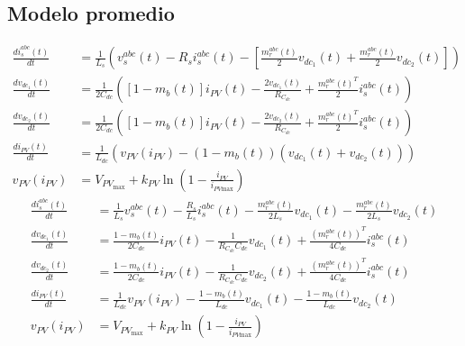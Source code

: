 \documentclass[11pt, a4paper]{article}
\begin{document}
\subsection*{Modelo promedio}
\begin{align*}
    \frac{d i_{s}^{abc}(t)}{d t} &= \frac{1}{L_{s}} \left( v_{s}^{abc}(t) - R_{s} i_{s}^{abc}(t) -  \left[ \frac{m_r^{abc}(t)}{2} v_{dc_1}(t) + \frac{m_r^{abc}(t)}{2} v_{dc_2}(t) \right] \right) \\[10pt]
    \frac{d v_{dc_1}(t)}{d t} &= \frac{1}{2 C_{dc}} \left( [1 - m_{b}(t)] i_{PV}(t) - \frac{2 v_{dc_1}(t)}{R_{C_{dc}}} + \frac{{m_r^{abc}(t)}^T}{2} i_{s}^{abc}(t) \right) \\[10pt]
    \frac{d v_{dc_2}(t)}{d t} &= \frac{1}{2 C_{dc}} \left( [1 - m_{b}(t)] i_{PV}(t) - \frac{2 v_{dc_2}(t)}{R_{C_{dc}}} + \frac{{m_r^{abc}(t)}^{T}}{2} i_{s}^{abc}(t) \right) \\[10pt]
    \frac{d i_{PV}(t)}{d t} &= \frac{1}{L_{dc}} \left( v_{PV}(i_{PV}) - (1 - m_{b}(t)) (v_{dc_1}(t) + v_{dc_2}(t)) \right) \\ 
    v_{PV}(i_{PV})&=V_{PV_\text{max}}+k_{PV}\ln\left(1-\frac{i_{PV}}{i_{PV\text{max}}}\right)
\end{align*}
\begin{align*}
    \frac{d i_{s}^{abc}(t)}{d t} &= \frac{1}{L_{s}} v_{s}^{abc}(t) - \frac{R_{s}}{L_{s}} i_{s}^{abc}(t) - \frac{m_r^{abc}(t)}{2 L_s} v_{dc_1}(t) - \frac{m_r^{abc}(t)}{2 L_s} v_{dc_2}(t) \\[12pt]
    \frac{d v_{dc_1}(t)}{d t} &= \frac{1 - m_{b}(t)}{2 C_{dc}} i_{PV}(t) - \frac{1}{R_{C_{dc}} C_{dc}} v_{dc_1}(t) + \frac{(m_r^{abc}(t))^T}{4 C_{dc}} i_{s}^{abc}(t) \\[12pt]
    \frac{d v_{dc_2}(t)}{d t} &= \frac{1 - m_{b}(t)}{2 C_{dc}} i_{PV}(t) - \frac{1}{R_{C_{dc}} C_{dc}} v_{dc_2}(t) + \frac{(m_r^{abc}(t))^T}{4 C_{dc}} i_{s}^{abc}(t) \\[12pt]
    \frac{d i_{PV}(t)}{d t} &= \frac{1}{L_{dc}} v_{PV}(i_{PV}) - \frac{1 - m_{b}(t)}{L_{dc}} v_{dc_1}(t) - \frac{1 - m_{b}(t)}{L_{dc}} v_{dc_2}(t) \\[12pt]
    v_{PV}(i_{PV})&=V_{PV_\text{max}}+k_{PV}\ln\left(1-\frac{i_{PV}}{i_{PV\text{max}}}\right)
\end{align*}
\end{document}
